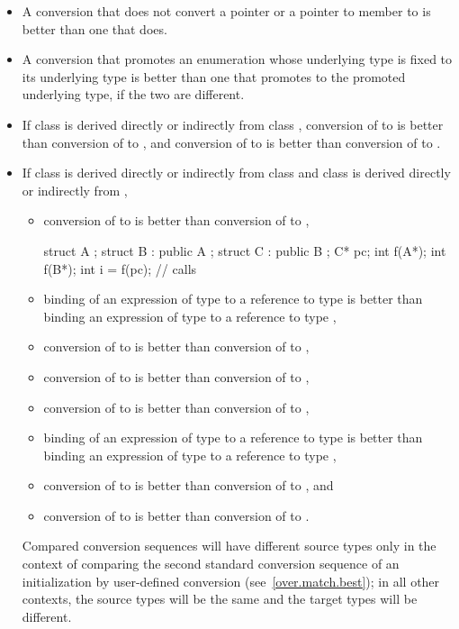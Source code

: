 \begin{itemize}
\item
A conversion that does not convert a pointer or a pointer to member
to
is better than one that does.

\item
A conversion that promotes an enumeration whose underlying type is fixed to its underlying
type is better than one that promotes to the promoted underlying type, if the two are
different.

\item
If class
is derived directly or indirectly from class
,
conversion of
to
is better than conversion of
to
,
and conversion of
to
is better than conversion
of
to
.
\item
If class
is derived directly or indirectly from class
and class
is derived directly or indirectly from
,
\begin{itemize}
\item
conversion of
to
is better than conversion of
to
,
\begin{example}
\begin{codeblock}
struct A {};
struct B : public A {};
struct C : public B {};
C* pc;
int f(A*);
int f(B*);
int i = f(pc);                  // calls 
\end{codeblock}
\end{example}

\item
binding of an expression of type
to a reference to type
is better than binding an expression of type
to a reference to type
,
\item
conversion of
to
is better than conversion of
to
,
\item
conversion of
to
is better than conversion of
to
,
\item
conversion of
to
is better than conversion of
to
,
\item
binding of an expression of type
to a reference to type
is better than binding an expression of type
to a
reference to type
,
\item
conversion of
to
is better than conversion
of
to
,
and
\item
conversion of
to
is better than conversion of
to
.
\end{itemize}

\begin{note}
Compared conversion sequences will have different source types only in the
context of comparing the second standard conversion sequence of an
initialization by user-defined conversion (see~\ref{over.match.best}); in
all other contexts, the source types will be the same and the target
types will be different.
\end{note}
\end{itemize}%
